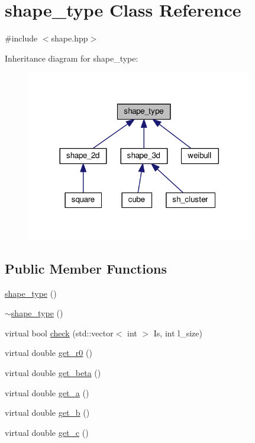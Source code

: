 \hypertarget{classshape__type}{}\section{shape\+\_\+type Class Reference}
\label{classshape__type}


{\ttfamily \#include $<$shape.\+hpp$>$}



Inheritance diagram for shape\+\_\+type\+:\nopagebreak
\begin{figure}[H]
\begin{center}
\leavevmode
\includegraphics[width=281pt]{d2/da8/classshape__type__inherit__graph}
\end{center}
\end{figure}
\subsection*{Public Member Functions}
\begin{DoxyCompactItemize}
\item 
\hyperlink{classshape__type_a166412643048108f9d26fff1aa4078c0}{shape\+\_\+type} ()
\item 
\hyperlink{classshape__type_a409407285e724c1956488a9c807ac2ca}{$\sim$shape\+\_\+type} ()
\item 
virtual bool \hyperlink{classshape__type_a69a17f14890bf130c990d2d54ddf6f86}{check} (std\+::vector$<$ int $>$ Is, int l\+\_\+size)
\item 
virtual double \hyperlink{classshape__type_af0fc24250d5cb5cbc4881caffee31371}{get\+\_\+r0} ()
\item 
virtual double \hyperlink{classshape__type_ad04d2331bc8bcd8504719fec8e852f32}{get\+\_\+beta} ()
\item 
virtual double \hyperlink{classshape__type_a68e467cf7ec75b436f0d0054d824766d}{get\+\_\+a} ()
\item 
virtual double \hyperlink{classshape__type_a4db290d08ad12bf153d6f8ffdc4d44af}{get\+\_\+b} ()
\item 
virtual double \hyperlink{classshape__type_a5ab8305b100bc3bba1ae4c14bd8257da}{get\+\_\+c} ()
\end{DoxyCompactItemize}


